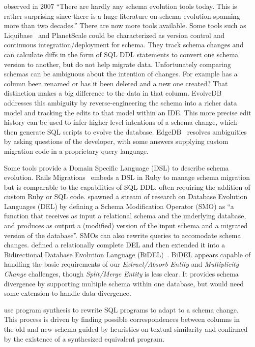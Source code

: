 \documentclass[english,submission]{programming}
\begin{document}
\citet{bernstein07} observed in 2007 ``There are hardly any schema evolution tools today. This is rather surprising since there is a huge literature on schema evolution spanning more than two decades.'' There are now more tools available. Some tools such as Liquibase~\cite{liquibase} and PlanetScale\cite{planetscale} could be characterized as version control and continuous integration/deployment for schema. They track schema changes and can calculate diffs in the form of SQL DDL statements to convert one schema version to another, but do not help migrate data. Unfortunately comparing schemas can be ambiguous about the intention of changes. For example has a column been renamed or has it been deleted and a new one created? That distinction makes a big difference to the data in that column. EvolveDB\cite{evolvedb} addresses this ambiguity by reverse-engineering the schema into a richer data model and tracking the edits to that model within an IDE. This more precise edit history can be used to infer higher level intentions of a schema change, which then generate SQL scripts to evolve the database. EdgeDB~\cite{edgedb} resolves ambiguities by asking questions of the developer, with some answers supplying custom migration code in a proprietary query language.

Some tools provide a Domain Specific Language (DSL) to describe schema evolution. Rails Migrations~\cite{RailsMigrations} embeds a DSL in Ruby to manage schema migration but is comparable to the capabilities of SQL DDL, often requiring the addition of custom Ruby or SQL code. \citet{curino08} spawned a stream of research on Database Evolution Languages (DEL) by defining a Schema Modification Operator (SMO) as ``a function that receives as input a relational schema and the underlying database, and produces as output a (modified) version of the input schema and a migrated version of the database''. SMOs can also rewrite queries to accomodate schema changes. \citet{herrmann15} defined a relationally complete DEL and then extended it into a Bidirectional Database Evolution Language (BiDEL)~\cite{herrmann17}. BiDEL appears capable of handling the basic requirements of our \textit{Extract/Absorb Entity} and \textit{Multiplicity Change} challenges, though \textit{Split/Merge Entity} is less clear. It provides schema divergence by supporting multiple schema within one database, but would need some extension to handle data divergence.

\citet{wang19} use program synthesis to rewrite SQL programs to adapt to a schema change. This process is driven by finding possible correspondences between columns in the old and new schema guided by heuristics on textual similarity and confirmed by the existence of a synthesized equivalent program.

\end{document}
